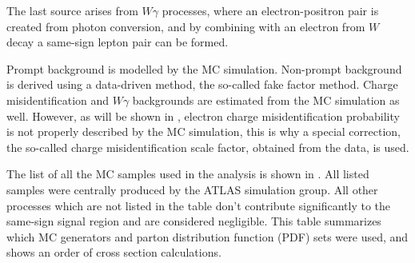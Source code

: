 The last source arises from $W\gamma$ processes, where an electron-positron pair is created from photon conversion, and by combining with an electron from $W$ decay
a same-sign lepton pair can be formed. 

Prompt background is modelled by the MC simulation. 
Non-prompt background is derived using a data-driven method, the so-called fake factor method.
Charge misidentification and $W\gamma$ backgrounds are estimated from the MC simulation as well. However, as will be shown in , electron charge misidentification probability is not properly described by the MC simulation, this is why a special correction, the so-called charge misidentification scale factor, obtained from the data, is used.

The list of all the MC samples used in the analysis is shown in . 
All listed samples were centrally produced by the ATLAS simulation group.
All other processes which are not listed in the table don't contribute
significantly to the same-sign signal region and are considered negligible.
This table summarizes which MC generators and parton distribution function (PDF) sets were used, and shows an order of cross section calculations.


